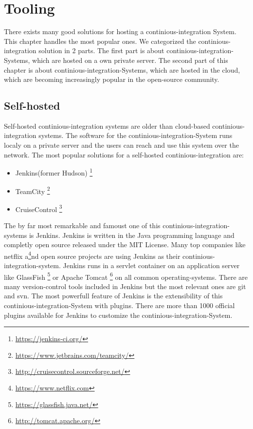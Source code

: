 \section{Tooling}\label{sec:tooling}

There exists many good solutions for hosting a continious-integration System. 
This chapter handles the most popular ones.
We categorized the continious-integration solution in 2 parts.
The first part is about continious-integration-Systems, which are hosted on a own private server. 
The second part of this chapter is about continious-integration-Systems, which are hosted in the cloud, which are becoming increasingly popular in the open-source community.

\subsection{Self-hosted}\label{sec:tooling-self-hosted}

Self-hosted continious-integration systems are older than cloud-based continious-integration systems.
The software for the continious-integration-System runs localy on a private server 
and the users can reach and use this system over the network. 
The most popular solutions for a self-hosted continious-integration are:
\begin{itemize} 
    \item Jenkins(former Hudson) \footnote{\url{https://jenkins-ci.org/}}
    \item TeamCity \footnote{\url{https://www.jetbrains.com/teamcity/}}
    \item CruiseControl \footnote{\url{http://cruisecontrol.sourceforge.net/}}
\end{itemize}
The by far most remarkable and famoust one of this continious-integration-systems is Jenkins. 
Jenkins is written in the Java programming language and completly open source released under the MIT License.
Many top companies like netflix a\footnote{\url{https://www.netflix.com}}nd open source projects are using Jenkins as their continious-integration-system.
Jenkins runs in a servlet container on an application server like GlassFish \footnote{\url{https://glassfish.java.net/}}
or Apache Tomcat \footnote{\url{http://tomcat.apache.org/}}
on all common operating-systems.
There are many version-control tools included in Jenkins but the most relevant ones are git and svn.
The most powerfull feature of Jenkins is the extensibility of this continious-integration-System with plugins.
There are more than 1000 official plugins available for Jenkins to customize the continious-integration-System.  


